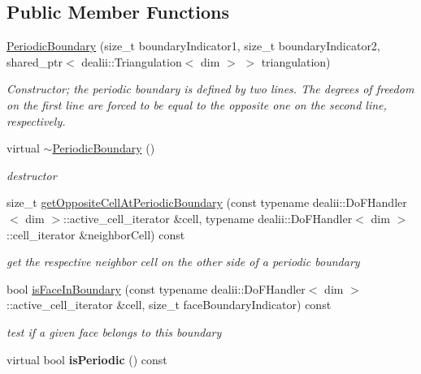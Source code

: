 \subsection*{Public Member Functions}
\begin{DoxyCompactItemize}
\item 
\hyperlink{classnatrium_1_1PeriodicBoundary_aac12a26adafba9f31b6fa7b417933340}{Periodic\-Boundary} (size\-\_\-t boundary\-Indicator1, size\-\_\-t boundary\-Indicator2, shared\-\_\-ptr$<$ dealii\-::\-Triangulation$<$ dim $>$ $>$ triangulation)
\begin{DoxyCompactList}\small\item\em Constructor; the periodic boundary is defined by two lines. The degrees of freedom on the first line are forced to be equal to the opposite one on the second line, respectively. \end{DoxyCompactList}\item 
\hypertarget{classnatrium_1_1PeriodicBoundary_ae71c1a8ea1f1f9e29be8ab6496125a5c}{virtual \hyperlink{classnatrium_1_1PeriodicBoundary_ae71c1a8ea1f1f9e29be8ab6496125a5c}{$\sim$\-Periodic\-Boundary} ()}\label{classnatrium_1_1PeriodicBoundary_ae71c1a8ea1f1f9e29be8ab6496125a5c}

\begin{DoxyCompactList}\small\item\em destructor \end{DoxyCompactList}\item 
size\-\_\-t \hyperlink{classnatrium_1_1PeriodicBoundary_ac790bcd5edc7fc6e009c6e93019c8f13}{get\-Opposite\-Cell\-At\-Periodic\-Boundary} (const typename dealii\-::\-Do\-F\-Handler$<$ dim $>$\-::active\-\_\-cell\-\_\-iterator \&cell, typename dealii\-::\-Do\-F\-Handler$<$ dim $>$\-::cell\-\_\-iterator \&neighbor\-Cell) const 
\begin{DoxyCompactList}\small\item\em get the respective neighbor cell on the other side of a periodic boundary \end{DoxyCompactList}\item 
bool \hyperlink{classnatrium_1_1PeriodicBoundary_a80e5b08192d3e5ebe3ad0489966b4433}{is\-Face\-In\-Boundary} (const typename dealii\-::\-Do\-F\-Handler$<$ dim $>$\-::active\-\_\-cell\-\_\-iterator \&cell, size\-\_\-t face\-Boundary\-Indicator) const 
\begin{DoxyCompactList}\small\item\em test if a given face belongs to this boundary \end{DoxyCompactList}\item 
\hypertarget{classnatrium_1_1PeriodicBoundary_a38c5e966e4b2a1ee185a5634fc379393}{virtual bool {\bfseries is\-Periodic} () const }\label{classnatrium_1_1PeriodicBoundary_a38c5e966e4b2a1ee185a5634fc379393}


\end{DoxyCompactItemize}
